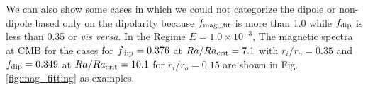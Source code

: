 

{\color{blue}
We can also show some cases in which we could not categorize the dipole or non-dipole based only on the dipolarity because $f_{\rm mag\_fit}$ is more than 1.0 while $f_{\rm dip}$ is less than 0.35 or {\it vis versa}. In the Regime $E = 1.0 \times 10^{-3}$, The magnetic spectra at CMB for the cases for $f_{\rm dip} = 0.376$ at $Ra/Ra_{\rm crit} = 7.1$ with $r_i/r_o = 0.35$ and $f_{\rm dip} = 0.349$ at $Ra/Ra_{\rm crit} = 10.1$ for $r_i/r_o = 0.15$ are shown in 
Fig. \ref{fig:mag_fitting} as examples.
}





